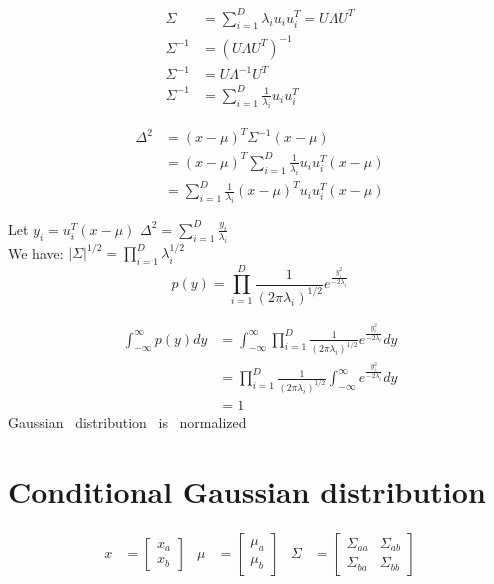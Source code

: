 \documentclass[12pt,letterpaper]{article}
\begin{document}
	\begin{equation*}
	    \begin{split}
	        \Sigma &= \sum_{i=1}^{D}\lambda_i u_i u_i^T = U\Lambda U^T\\
	        \Sigma^{-1} &= (U\Lambda U^T)^{-1}\\
	        \Sigma^{-1} &= U\Lambda^{-1}U^T\\
	        \Sigma^{-1} &=  \sum_{i=1}^{D}\frac{1}{\lambda_i}u_i u_i^T
	    \end{split}
	\end{equation*}
	
	\begin{equation*}
	    \begin{split}
            \Delta^2 &= (x - \mu)^T\Sigma^{-1}(x-\mu)\\
                     &= (x-\mu)^T\sum_{i=1}^{D}\frac{1}{\lambda_i}u_i u_i^T(x-\mu)\\
                     &= \sum_{i=1}^{D}\frac{1}{\lambda_i}(x-\mu)^Tu_i u_i^T(x-\mu)
	    \end{split}
	\end{equation*}
	
	Let \(y_i = u_i^T(x-\mu)\) \rightarrow \(\Delta^2 = \sum_{i=1}^{D}\frac{y_i}{\lambda_i}\)\\
	We have: \(|\Sigma|^{1/2} = \prod_{i=1}^{D}\lambda_i^{1/2}\)
	\rightarrow \[p(y) = \prod_{i=1}^{D}\frac{1}{(2\pi\lambda_i)^{1/2}}e^{\frac{y_i^2}{-2\lambda_i}}\]
    	
    \begin{equation*}
	    \begin{split}
            \int_{-\infty}^{\infty}p(y)dy &=  \int_{-\infty}^{\infty}\prod_{i=1}^{D}\frac{1}{(2\pi\lambda_i)^{1/2}}e^{\frac{y_i^2}{-2\lambda_i}}dy\\
            &= \prod_{i=1}^{D}\frac{1}{(2\pi\lambda_i)^{1/2}}\int_{-\infty}^{\infty}e^{\frac{y_i^2}{-2\lambda_i}}dy\\
            &= 1
	    \end{split}
	\end{equation*}
	\rightarrow Gaussian \ distribution \ is \ normalized\\
	
	\section{Conditional Gaussian distribution}
	\begin{align*}
	    x &= \begin{bmatrix}x_a\\x_b\end{bmatrix} & 
	  \mu &= \begin{bmatrix}\mu_a\\\mu_b\end{bmatrix} &
   \Sigma &= \begin{bmatrix}\Sigma_{aa} & \Sigma_{ab}\\\Sigma_{ba} & \Sigma_{bb}\end{bmatrix}
	\end{align*}
	
\end{document}
